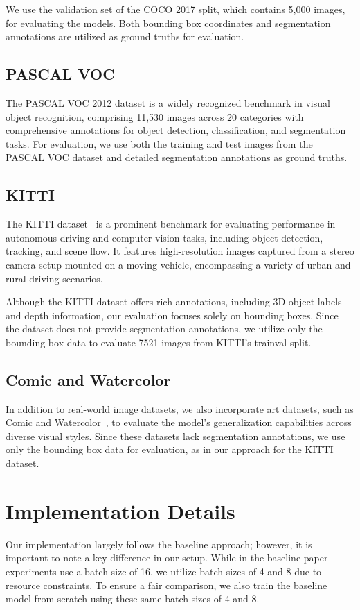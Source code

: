 We use the validation set of the COCO 2017 split, which contains 5,000 images, for evaluating the models. Both bounding box coordinates and segmentation annotations are utilized as ground truths for evaluation.

\subsection{PASCAL VOC}
The PASCAL VOC 2012 dataset is a widely recognized benchmark in visual object recognition, comprising 11,530 images across 20 categories with comprehensive annotations for object detection, classification, and segmentation tasks. For evaluation, we use both the training and test images from the PASCAL VOC dataset and detailed segmentation annotations as ground truths.

\subsection{KITTI}
The KITTI dataset~\cite{Geiger2013IJRR} is a prominent benchmark for evaluating performance in autonomous driving and computer vision tasks, including object detection, tracking, and scene flow. It features high-resolution images captured from a stereo camera setup mounted on a moving vehicle, encompassing a variety of urban and rural driving scenarios. 

Although the KITTI dataset offers rich annotations, including 3D object labels and depth information, our evaluation focuses solely on bounding boxes. Since the dataset does not provide segmentation annotations, we utilize only the bounding box data to evaluate 7521 images from KITTI’s trainval split.

\subsection{Comic and Watercolor}
In addition to real-world image datasets, we also incorporate art datasets, such as Comic and Watercolor~\cite{Inoue_2018_CVPR}, to evaluate the model's generalization capabilities across diverse visual styles. Since these datasets lack segmentation annotations, we use only the bounding box data for evaluation, as in our approach for the KITTI dataset. 

\section{Implementation Details}
\label{section:implementation_details}
Our implementation largely follows the baseline approach; however, it is important to note a key difference in our setup. While in the baseline paper experiments use a batch size of 16, we utilize batch sizes of 4 and 8 due to resource constraints. To ensure a fair comparison, we also train the baseline model from scratch using these same batch sizes of 4 and 8.


